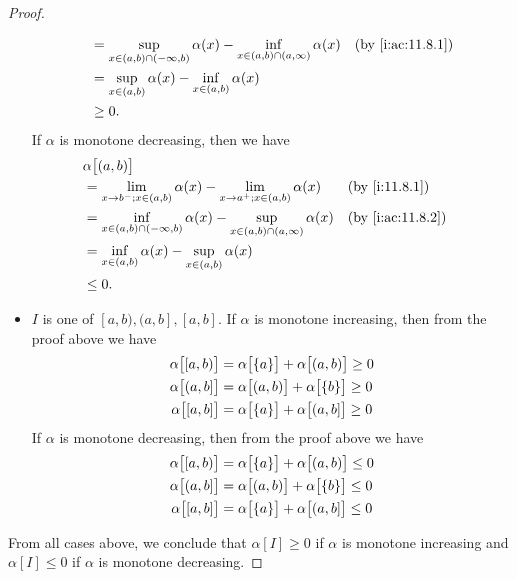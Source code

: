 \begin{proof}
\begin{itemize}
\begin{align*}
             & = \sup_{x \in (a, b) \cap (-\infty, b)} \alpha(x) - \inf_{x \in (a, b) \cap (a, \infty)} \alpha(x) &  & \by{i:ac:11.8.1} \\
             & = \sup_{x \in (a, b)} \alpha(x) - \inf_{x \in (a, b)} \alpha(x)                                                          \\
             & \geq 0.
          \end{align*}
          If \(\alpha\) is monotone decreasing, then we have
          \begin{align*}
             & \alpha\big[(a, b)\big]                                                                                                   \\
             & = \lim_{x \to b^- ; x \in (a, b)} \alpha(x) - \lim_{x \to a^+ ; x \in (a, b)} \alpha(x)            &  & \by{i:11.8.1}    \\
             & = \inf_{x \in (a, b) \cap (-\infty, b)} \alpha(x) - \sup_{x \in (a, b) \cap (a, \infty)} \alpha(x) &  & \by{i:ac:11.8.2} \\
             & = \inf_{x \in (a, b)} \alpha(x) - \sup_{x \in (a, b)} \alpha(x)                                                          \\
             & \leq 0.
          \end{align*}
    \item \(I\) is one of \([a, b), (a, b], [a, b]\).
          If \(\alpha\) is monotone increasing, then from the proof above we have
          \begin{align*}
            \alpha\big[[a, b)\big] & = \alpha\big[\set{a}\big] + \alpha\big[(a, b)\big] \geq 0 \\
            \alpha\big[(a, b]\big] & = \alpha\big[(a, b)\big] + \alpha\big[\set{b}\big] \geq 0 \\
            \alpha\big[[a, b]\big] & = \alpha\big[\set{a}\big] + \alpha\big[(a, b]\big] \geq 0
          \end{align*}
          If \(\alpha\) is monotone decreasing, then from the proof above we have
          \begin{align*}
            \alpha\big[[a, b)\big] & = \alpha\big[\set{a}\big] + \alpha\big[(a, b)\big] \leq 0 \\
            \alpha\big[(a, b]\big] & = \alpha\big[(a, b)\big] + \alpha\big[\set{b}\big] \leq 0 \\
            \alpha\big[[a, b]\big] & = \alpha\big[\set{a}\big] + \alpha\big[(a, b]\big] \leq 0
          \end{align*}
  \end{itemize}
  From all cases above, we conclude that \(\alpha[I] \geq 0\) if \(\alpha\) is monotone increasing and \(\alpha[I] \leq 0\) if \(\alpha\) is monotone decreasing.
\end{proof}


